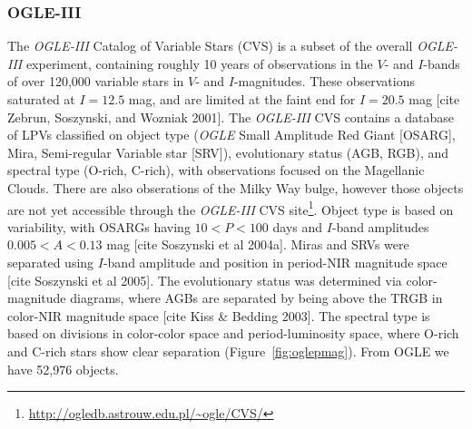 \subsubsection{OGLE-III}\label{sec:ogle}
The \emph{OGLE-III} Catalog of Variable Stars (CVS) \citep{2008AcA....58...69U,2009AcA....59..239S,2011AcA....61..217S} is a subset of the overall \emph{OGLE-III} experiment, containing roughly 10 years of observations in the $V$- and $I$-bands of over 120,000 variable stars in  $V$- and $I$-magnitudes. These observations saturated at $I = 12.5$ mag, and are limited at the faint end for $I = 20.5$ mag {\color{red}[cite Zebrun, Soszynski, and Wozniak 2001]}. The \emph{OGLE-III} CVS contains a database of LPVs classified on object type (\emph{OGLE} Small Amplitude Red Giant [OSARG], Mira, Semi-regular Variable star [SRV]), evolutionary status (AGB, RGB), and spectral type (O-rich, C-rich), with observations focused on the Magellanic Clouds. There are also obserations of the Milky Way bulge, however those objects are not yet accessible through the \emph{OGLE-III} CVS site\footnote{\url{http://ogledb.astrouw.edu.pl/~ogle/CVS/}}. Object type is based on variability, with OSARGs having $10<P<100$ days and $I$-band amplitudes $0.005 < A < 0.13$ mag {\color{red} [cite Soszynski et al 2004a]}. Miras and SRVs were separated using $I$-band amplitude and position in period-NIR magnitude space {\color{red} [cite Soszynski et al 2005]}. The evolutionary status was determined via color-magnitude diagrams, where AGBs are separated by being above the TRGB in color-NIR magnitude space {\color{red}[cite Kiss \& Bedding 2003]}. The spectral type is based on divisions in color-color space and period-luminosity space, where O-rich and C-rich stars show clear separation (Figure~\ref{fig:oglepmag}). From OGLE we have 52,976 objects.

